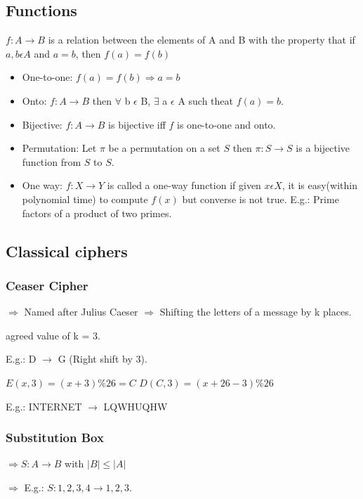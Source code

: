 \documentclass[11pt]{article}
\begin{document}
	\subsection{Functions}
	$f: A \rightarrow B$ is a relation between the elements of A and B with the property that if  $a,b \epsilon A$ and $a = b$, then $f(a) = f(b)$
	\begin{itemize}
		\item One-to-one: $f(a) = f(b) \Rightarrow a = b$
		\item Onto: $f: A \rightarrow B $ then $\forall$ b  $\epsilon$ B,  $ \exists$ a $\epsilon$ A  such theat $f(a) = b$.
		\item Bijective: $f: A \rightarrow B $ is bijective iff $f$ is one-to-one and onto.
		\item Permutation: Let $\pi$ be a permutation on a set $S$ then $\pi: S \rightarrow S$ is a bijective function from $S$ to $S$.
		\item One way: $f: X \rightarrow Y $ is called a one-way function if given $x \epsilon X$, it is easy(within polynomial time) to compute $f(x)$ but converse is not true.
		\subitem E.g.: Prime factors of a product of two primes.
	\end{itemize} 
	
	
	\subsection{Classical ciphers}
	\subsubsection{Ceaser Cipher}
	$\Rightarrow$ Named after Julius Caeser
	$\Rightarrow$ Shifting the letters of a message by k places.
	\begin{center}
		agreed value of k = 3.
	\end{center}
	E.g.: D $\rightarrow$ G (Right shift by 3).
	\begin{center}
		$E(x,3) = (x + 3)\%26 = C$ \newline
		$D(C, 3) = (x + 26 - 3)\%26$ \newline
	\end{center}
	E.g.: INTERNET $\rightarrow$ LQWHUQHW
	\subsubsection*{Substitution Box}
	\begin{center}
		\item $\Rightarrow S: A \rightarrow B $ with $|B| \leq |A| $
		\item $\Rightarrow$ E.g.: $S: {1,2,3,4} \rightarrow {1,2,3}$.
	\end{center}
	
\end{document}
